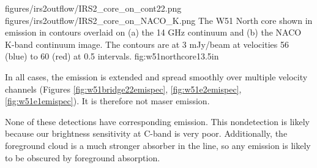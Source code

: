 \FigureTwo
{figures/irs2outflow/IRS2_core_on_cont22.png}
{figures/irs2outflow/IRS2_core_on_NACO_K.png}
{The W51 North core shown in \formaldehyde \twotwo emission in contours
overlaid on (a) the 14 GHz continuum and (b) the NACO K-band continuum image.
The contours are at 3 mJy/beam at velocities 56 (blue) to 60 (red) \kms at 0.5
\kms intervals.
}
{fig:w51northcore}{1}{3.5in}

In all cases, the emission is extended and spread smoothly over multiple
velocity channels (Figures 
\ref{fig:w51bridge22emispec}, \ref{fig:w51e2emispec}, \ref{fig:w51e1emispec}).
It is therefore not maser emission.

None of these detections have corresponding \oneone emission.  This
nondetection is likely because our brightness sensitivity at C-band is very
poor.    Additionally,
the foreground cloud is a much stronger absorber in the \oneone line, so any
emission is likely to be obscured by foreground absorption.




